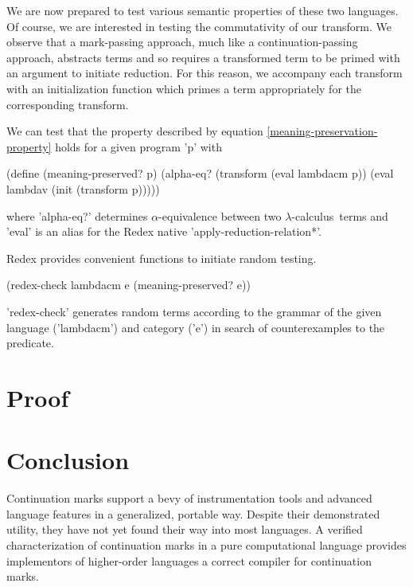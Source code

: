 \documentclass{llncs}
\newcommand{\lc}[0]{$\lambda$-calculus}
\begin{document}
We are now prepared to test various semantic properties of these two languages. Of course, we are interested in testing the commutativity of our transform. We observe that a mark-passing approach, much like a continuation-passing approach, abstracts terms and so requires a transformed term to be primed with an argument to initiate reduction. For this reason, we accompany each transform with an initialization function which primes a term appropriately for the corresponding transform.

We can test that the property described by equation \ref{meaning-preservation-property} holds for a given program \scheme'p' with 
\begin{schemedisplay}
(define (meaning-preserved? p)
  (alpha-eq? (transform (eval lambdacm p)) (eval lambdav (init (transform p)))))
\end{schemedisplay}
where \scheme'alpha-eq?' determines $\alpha$-equivalence between two \lc\ terms and \scheme'eval' is an alias for the Redex native \scheme'apply-reduction-relation*'.

Redex provides convenient functions to initiate random testing.

\begin{schemedisplay}
(redex-check lambdacm e (meaning-preserved? e))
\end{schemedisplay}

\scheme'redex-check' generates random terms according to the grammar of the given language (\scheme'lambdacm') and category (\scheme'e') in search of counterexamples to the predicate. 

\section{Proof}

\section{Conclusion}

Continuation marks support a bevy of instrumentation tools and advanced language features in a generalized, portable way. Despite their demonstrated utility, they have not yet found their way into most languages. A verified characterization of continuation marks in a pure computational language provides implementors of higher-order languages a correct compiler for continuation marks.



\end{document}
